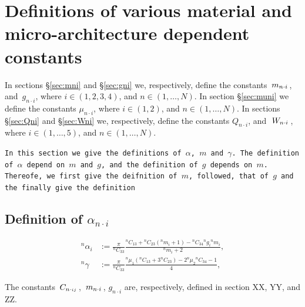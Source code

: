 \documentclass[preprint,12pt,times]{elsarticle}
\numberwithin{equation}{section}
\newcommand{\msub}[2]{
\IfEqCase{#2}{
      {i}{\, m_{#1\cdot #2}\,}%
  }[\,m_{#1\cdot {\scriptscriptstyle #2}}\,]}
\newcommand{\gsub}[2]{g_{#1\cdot #2}}
\newcommand{\Qsub}[2]{Q_{#1\cdot #2}}
\newcommand{\Wsub}[2]{
\IfEqCase{#2}{
      {i}{\, W_{#1\cdot #2}\,}%
  }[\,W_{#1\cdot {\scriptscriptstyle #2}}\,]}
\newcommand{\musub}[2]{\mu_{#1\cdot #2}}
\newcommand{\Csub}[2]{
   \IfEqCase{#2}{
          {xxxx}{\,\beta_{ {#1}\cdot { #2}}\,}%
      }[\,C_{ {#1}\cdot {\scriptscriptstyle #2}}\,]}
\renewcommand{\>}{$\Rightarrow$}
\begin{document}
\newpage
\appendix

\section{Definitions of various material and micro-architecture dependent constants}
\label{Appen:MatConst}



In sections \S\ref{sec:mni} and \S\ref{sec:gni} we, respectively, define the constants $\msub{n}{i}$, and~$\gsub{n}{i}$, where $i\in (1,2,3,4)$, and $n\in(1,\ldots,N)$. In section \S\ref{sec:muni} we define the constants $\musub{n}{i}$, where $i\in (1,2)$, and $n\in(1,\ldots,N)$. In sections \S\ref{sec:Qni} and \S\ref{sec:Wni} we, respectively, define the constants $\Qsub{n}{i}$, and~$\Wsub{n}{i}$, where $i\in (1,\ldots,5)$, and $n\in(1,\ldots,N)$.


\texttt{In this section we give the definitions of $\alpha$, $m$ and $\gamma$. The definition of $\alpha$ depend on $m$ and $g$, and the definition of $g$ depends on $m$. Thereofe, we first give the deifnition of $m$, followed, that of $g$ and the finally give the definition}


\subsection{Definition of $\alpha_{n\cdot i}$}

\begin{align}
{}^{n}\!{\alpha_{i}} & := \frac{\pi}{{}^{n}\!{C_{33}}} \frac{  {}^{n}\!{C_{13}} + {}^{n}\!{C_{23}}({}^{n}\!{m_{i}} + 1) - {}^{n}\!{C_{34}} {}^{n}\!{g_{i}} {}^{n}\!{m_{i}} }{{}^{n}\!{m_{i}}+2}, \\
{}^{n}\!\gamma & := \frac{\pi}{{}^{n}\!{C_{33}}} \frac{ {}^{n}\!{\mu_{1}} ({}^{n}\!{C_{13}} + 3{}^{n}\!{C_{23}}) - 2{}^{n}\!{\mu_{2}} {}^{n}\!{C_{34}} - 1  }{4},
\end{align}

The constants $\Csub{n}{ij}$, $\msub{n}{i}$, $\gsub{n}{i}$ are, respectively, defined in section XX, YY, and ZZ.
\end{document}
